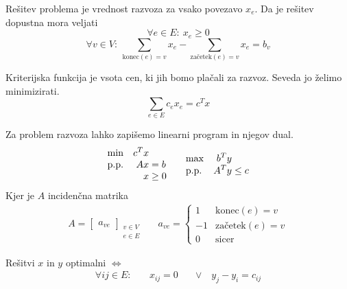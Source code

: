 \documentclass[a4paper,8pt]{extarticle}
\begin{document}
\begin{multicols}{4}
Rešitev problema je vrednost razvoza za vsako povezavo $x_e$. Da je rešitev dopustna mora veljati 
\[\forall e \in E : \ x_e \geq 0 \]
\[\forall v \in V : \ \sum_{\text{konec}(e) = v} x_e - \sum_{\text{začetek}(e) = v} x_e = b_v \]

Kriterijska funkcija je vsota cen, ki jih bomo plačali za razvoz. Seveda jo želimo minimizirati.
\[ \sum_{e \in E} c_e x_e = c^T x\]

Za problem razvoza lahko zapišemo linearni program in njegov dual.
\begin{align*}
	\begin{array}{l >{\displaystyle}r@{\;} l}
		\min 		& c^T x	\\		
		\text{p.p.} & Ax	& = b	 \\
					& x 	 						&\geq 0	
	\end{array} &&
	\begin{array}{l >{\displaystyle}r@{\;} l}
		\max 		& b^T y	\\		
		\text{p.p.} & A^T y	& \leq c	 \\
	\end{array}
\end{align*}
Kjer je $A$ incidenčna matrika
\begin{align*}
	A = \begin{bmatrix}
		a_{ve}
	\end{bmatrix}_{\substack{v \in V \\ e \in E}}
	&&
	a_{ve} = \begin{cases}
		1 & \text{konec}(e) = v \\
		-1 & \text{začetek}(e) = v \\
		0 & \text{sicer}
	\end{cases}
\end{align*}

Rešitvi $x$ in $y$ optimalni $\iff$
\begin{align*}
	\forall ij \in E: \ &&  x_{ij} = 0 \quad &\vee \quad y_j - y_i = c_{ij}
\end{align*}


\end{multicols}
\end{document}
